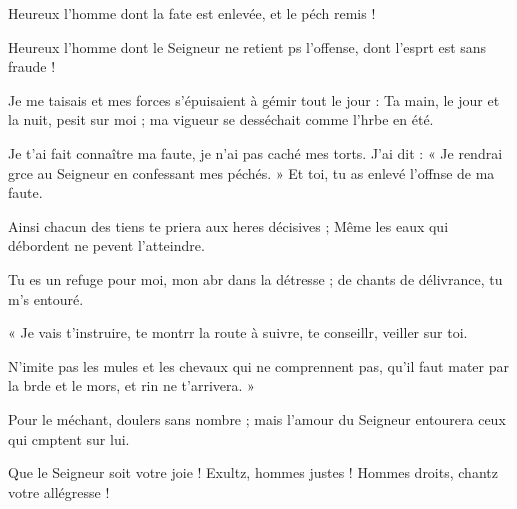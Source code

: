 \item Heureux l’homme dont la fate est enlevée,\psstar{} et le péch remis !
\item Heureux l’homme dont le Seigneur ne retient ps l’offense,\psstar{} dont l’esprt est sans fraude !
\item Je me taisais et mes forces s’épuisaient à gémir tout le jour :\pscross{} Ta main, le jour et la nuit, pesit sur moi ;\psstar{} ma vigueur se desséchait comme l’hrbe en été.
\item Je t’ai fait connaître ma faute, je n’ai pas caché mes torts.\pscross{} J’ai dit : « Je rendrai grce au Seigneur en confessant mes péchés. »\psstar{} Et toi, tu as enlevé l’offnse de ma faute.
\item Ainsi chacun des tiens te priera aux heres décisives ;\psstar{} Même les eaux qui débordent ne pevent l’atteindre.
\item Tu es un refuge pour moi, mon abr dans la détresse ;\psstar{} de chants de délivrance, tu m’s entouré.
\item « Je vais t’instruire, te montrr la route à suivre,\psstar{} te conseillr, veiller sur toi.
\item N’imite pas les mules et les chevaux qui ne comprennent pas,\pscross{} qu’il faut mater par la brde et le mors,\psstar{} et rin ne t’arrivera. »
\item Pour le méchant, doulers sans nombre ;\psstar{} mais l’amour du Seigneur entourera ceux qui cmptent sur lui.
\item Que le Seigneur soit votre joie ! Exultz, hommes justes !\psstar{} Hommes droits, chantz votre allégresse !